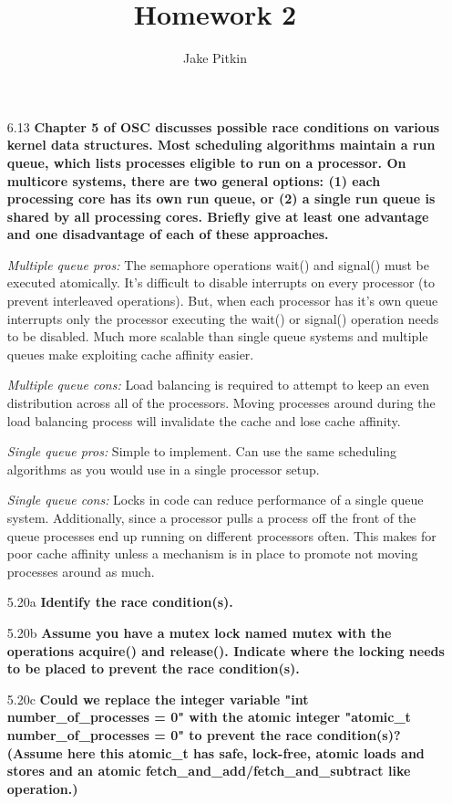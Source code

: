\documentclass[11pt, letterpaper]{hw}
\title{Homework 2}
\institute{University of Utah}
\author{Jake Pitkin}
\begin{document}
\maketitle

\begin{enumerate}

\item [6.13] \textbf{Chapter 5 of OSC discusses possible race conditions on various kernel data structures. Most scheduling algorithms maintain a run queue, which lists processes eligible to run on a processor. On multicore systems, there are two general options: (1) each processing core has its own run queue, or (2) a single run queue is shared by all processing cores. Briefly give at least one advantage and one disadvantage of each of these approaches.}

{\it Multiple queue pros:} The semaphore operations wait() and signal() must be executed atomically. It's difficult to disable interrupts on every processor (to prevent interleaved operations). But, when each processor has it's own queue interrupts only the processor executing the wait() or signal() operation needs to be disabled. Much more scalable than single queue systems and multiple queues make exploiting cache affinity easier.

{\it Multiple queue cons:} Load balancing is required to attempt to keep an even distribution across all of the processors. Moving processes around during the load balancing process will invalidate the cache and lose cache affinity.

{\it Single queue pros:} Simple to implement. Can use the same scheduling algorithms as you would use in a single processor setup.

{\it Single queue cons:} Locks in code can reduce performance of a single queue system. Additionally, since a processor pulls a process off the front of the queue processes end up running on different processors often. This makes for poor cache affinity unless a mechanism is in place to promote not moving processes around as much.

\item [5.20a] \textbf{Identify the race condition(s).}
 
\item [5.20b] \textbf{Assume you have a mutex lock named mutex with the operations acquire() and release(). Indicate where the locking needs to be placed to prevent the race condition(s).}

\item [5.20c] \textbf{Could we replace the integer variable "int number\_of\_processes = 0" with the atomic integer "atomic\_t number\_of\_processes = 0" to prevent the race condition(s)? (Assume here this atomic\_t has safe, lock-free, atomic loads and stores and an atomic fetch\_and\_add/fetch\_and\_subtract like operation.)}


\end{enumerate}
\end{document}
